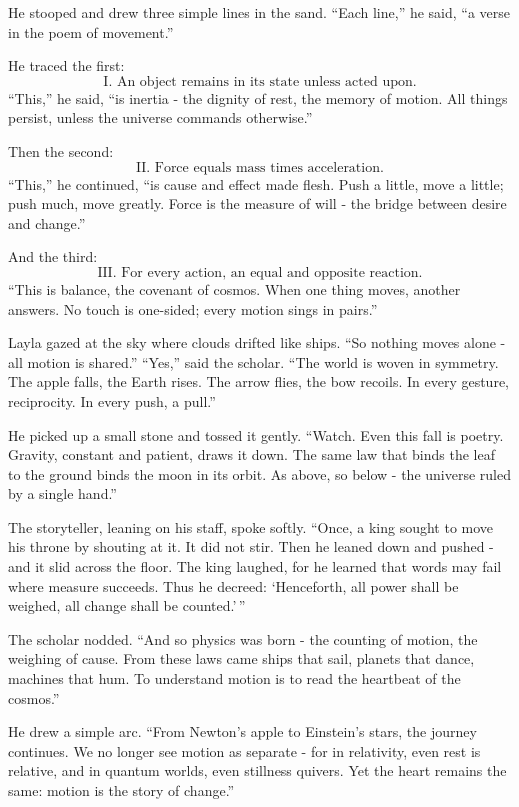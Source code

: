 \documentclass[
  letterpaper,
  DIV=11,
  numbers=noendperiod]{scrreprt}
\begin{document}
He stooped and drew three simple lines in the sand. ``Each line,'' he
said, ``a verse in the poem of movement.''

He traced the first: \[
\text{I. An object remains in its state unless acted upon.}
\] ``This,'' he said, ``is inertia - the dignity of rest, the memory of
motion. All things persist, unless the universe commands otherwise.''

Then the second: \[
\text{II. Force equals mass times acceleration.}
\] ``This,'' he continued, ``is cause and effect made flesh. Push a
little, move a little; push much, move greatly. Force is the measure of
will - the bridge between desire and change.''

And the third: \[
\text{III. For every action, an equal and opposite reaction.}
\] ``This is balance, the covenant of cosmos. When one thing moves,
another answers. No touch is one-sided; every motion sings in pairs.''

Layla gazed at the sky where clouds drifted like ships. ``So nothing
moves alone - all motion is shared.'' ``Yes,'' said the scholar. ``The
world is woven in symmetry. The apple falls, the Earth rises. The arrow
flies, the bow recoils. In every gesture, reciprocity. In every push, a
pull.''

He picked up a small stone and tossed it gently. ``Watch. Even this fall
is poetry. Gravity, constant and patient, draws it down. The same law
that binds the leaf to the ground binds the moon in its orbit. As above,
so below - the universe ruled by a single hand.''

The storyteller, leaning on his staff, spoke softly. ``Once, a king
sought to move his throne by shouting at it. It did not stir. Then he
leaned down and pushed - and it slid across the floor. The king laughed,
for he learned that words may fail where measure succeeds. Thus he
decreed: `Henceforth, all power shall be weighed, all change shall be
counted.'\,''

The scholar nodded. ``And so physics was born - the counting of motion,
the weighing of cause. From these laws came ships that sail, planets
that dance, machines that hum. To understand motion is to read the
heartbeat of the cosmos.''

He drew a simple arc. ``From Newton's apple to Einstein's stars, the
journey continues. We no longer see motion as separate - for in
relativity, even rest is relative, and in quantum worlds, even stillness
quivers. Yet the heart remains the same: motion is the story of
change.''
\end{document}
